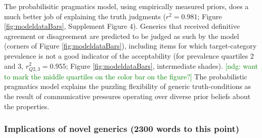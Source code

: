 \documentclass[10pt,letterpaper]{article}
\newcommand{\ndg}[1]{\textcolor{Green}{[ndg: #1]}}
\begin{document}

The probabilisitic pragmatics model, using empirically measured priors, does a much better job of explaining the truth judgments ($r^2=0.981$; Figure \ref{fig:modeldataBars}, Supplement Figure 4). 
Generics that received definitive agreement or disagreement are predicted to be judged as such by the model (corners of Figure \ref{fig:modeldataBars}), including items for which target-category prevalence is not a good indicator of the acceptability (for prevalence quartiles 2 and 3, $r_{Q2,3}^2=0.955$; Figure \ref{fig:modeldataBars}, intermediate shades). \ndg{want to mark the middle quartiles on the color bar on the figure?}
The probabilistic pragmatics model explains the puzzling flexibility of generic truth-conditions as the result of communicative pressures operating over diverse prior beliefs about the properties. 

\subsubsection*{Implications of novel generics (2300 words to this point)} 
\end{document}
